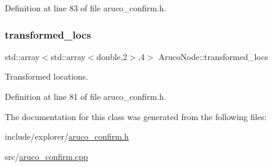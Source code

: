 Definition at line 83 of file aruco\+\_\+confirm.\+h.

\mbox{\label{class_aruco_node_ab410bc0b655071ee67e7ba63b4edf256}} 
\subsubsection{\texorpdfstring{transformed\+\_\+locs}{transformed\_locs}}
{\footnotesize\ttfamily std\+::array$<$std\+::array$<$double,2$>$,4$>$ Aruco\+Node\+::transformed\+\_\+locs}



Transformed locations. 



Definition at line 81 of file aruco\+\_\+confirm.\+h.



The documentation for this class was generated from the following files\+:\begin{DoxyCompactItemize}
\item 
include/explorer/\hyperlink{aruco__confirm_8h}{aruco\+\_\+confirm.\+h}\item 
src/\hyperlink{aruco__confirm_8cpp}{aruco\+\_\+confirm.\+cpp}\end{DoxyCompactItemize}
